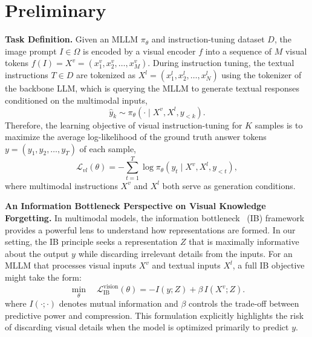 



    
    


\section{Preliminary}\label{sec:prelim}
\noindent\textbf{Task Definition.}
Given an MLLM $\pi_{\theta}$ and instruction-tuning dataset $D$, the image prompt $I\in \Omega$ is encoded by a visual encoder $f$ 
into a sequence of $M$ visual tokens $f(I)=X^v=(x_1^v,x_2^v,\dots,x_M^v)$.
During instruction tuning,
the textual instructions $T\in D$ are tokenized as $X^l=(x_1^l,x_2^l,\dots,x_N^l)$ using the tokenizer of the backbone LLM, 
which is querying the MLLM to generate textual responses conditioned on the multimodal inputs,
\begin{equation}
    \hat{y}_k \sim \pi_{\theta}(\cdot \mid X^v, X^l, y_{<k}).
\end{equation}
Therefore, the learning objective of visual instruction-tuning for $K$ samples is to 
maximize the average log-likelihood of the ground truth answer tokens $y =(y_1, y_2, \dots, y_T)$ of each sample,
\begin{equation}\label{eq:task_loss}
    \mathcal{L}_{vl}(\theta) = 
    -  \sum_{t=1}^{T} 
    \log \pi_\theta \left( y_t \mid X^v, X^l, y_{<t} \right),
\end{equation}
where multimodal instructions $X^v$ and $X^l$ both serve as generation conditions.


\vspace{1em}\noindent\textbf{An Information Bottleneck Perspective on Visual Knowledge Forgetting.}
In multimodal models, the information bottleneck~\cite{mai2022multimodal} (IB) framework provides a powerful lens to understand how representations are formed. 
In our setting, the IB principle seeks a representation \( Z \) that is maximally informative about the output \( y \) while discarding irrelevant details from the inputs. 
For an MLLM that processes visual inputs \( X^v \) and textual inputs \( X^l \), a full IB objective might take the form:
\begin{equation}\label{eq:ib_vision}
    \min_{\theta} \quad \mathcal{L}_{\text{IB}}^{\text{vision}}(\theta) = - I(y; Z) + \beta\, I(X^v; Z).
\end{equation}
where \( I(\cdot;\cdot) \) denotes mutual information and \(\beta\) controls the trade-off between predictive power and compression.
This formulation explicitly highlights the risk of discarding visual details when the model is optimized primarily to predict \( y \).

